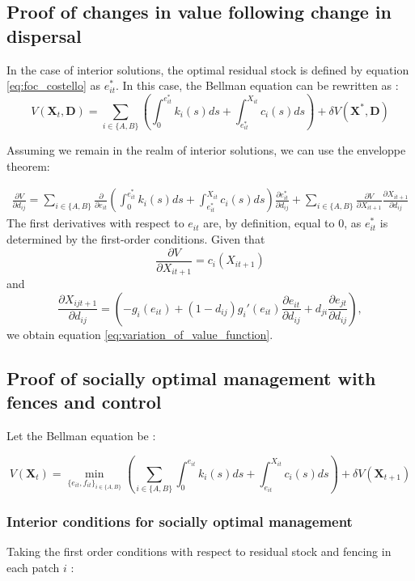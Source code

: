 \subsection{Proof of changes in value following change in dispersal}
In the case of interior solutions, the optimal residual stock is defined by equation \ref{eq:foc_costello} as $e^*_{it}$. In this case, the Bellman equation can be rewritten as : 
\begin{equation*}
V(\mathbf{X}_t, \mathbf{D}) = \sum_{i\in\{A,B\}}\left(\int_{0}^{e^*_{it}} k_i(s)ds + \int_{e_{it}^*}^{X_{it}} c_i(s)ds \right) + \delta V(\mathbf{X}^*, \mathbf{D})
\end{equation*}

Assuming we remain in the realm of interior solutions, we can use the enveloppe theorem:

\begin{align*}
\frac{\partial V}{\partial d_{ij}} = \sum_{i\in \{A,B\}} \frac{\partial }{\partial e_{it}}\left(\int_{0}^{e^*_{it}} k_i(s)ds + \int_{e_{it}^*}^{X_{it}} c_i(s)ds\right) \frac{\partial e_{it}^*}{\partial d_{ij}} + \sum_{i\in \{A,B\}}\frac{\partial V}{\partial X_{it+1}}\frac{\partial X_{it+1}}{\partial d_{ij}}
\end{align*}
The first derivatives with respect to $e_{it}$ are, by definition, equal to 0, as $e_{it}^*$ is determined by the first-order conditions. Given that
\[
\frac{\partial V}{\partial X_{it+1}} = c_i(X_{it+1})
\]
and
\[
\frac{\partial X_{ijt+1}}{\partial d_{ij}} = \left( - g_i(e_{it}) + (1 - d_{ij}) g_i'(e_{it}) \frac{\partial e_{it}}{\partial d_{ij}} + d_{ji} \frac{\partial e_{jt}}{\partial d_{ij}} \right),
\]
we obtain equation \ref{eq:variation_of_value_function}.

\subsection{Proof of socially optimal management with fences and control}

Let the Bellman equation be : 

\begin{equation}
V(\mathbf{X}_t) = \min_{\{e_{it}, f_{it}\}_{i \in \{A,B\}}}\left( \sum_{i\in\{A,B\}}\int_{0}^{e_{it}} k_i(s)ds + \int_{e_{it}}^{X_{it}} c_i(s)ds \right) + \delta V(\mathbf{X}_{t+1})
\end{equation}

\subsubsection{Interior conditions for socially optimal management}
\label{appendix:proof_stock_independence_foc}
Taking the first order conditions with respect to residual stock and fencing in each patch $i$ : 


